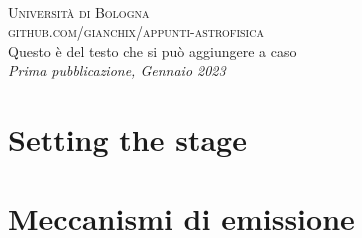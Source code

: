 \documentclass[11pt]{book} %
\begin{document}
\newpage
~\vfill
\thispagestyle{empty}


\noindent \textsc{Università di Bologna}\\

\noindent \textsc{github.com/gianchix/appunti-astrofisica}\\ %

\noindent Questo è del testo che si può aggiungere a caso\\ %

\noindent \textit{Prima pubblicazione, Gennaio 2023} %



\pagestyle{empty} %

\tableofcontents %


\pagestyle{fancy} %




%
{} %
\chapter{Setting the stage}




\chapter{Meccanismi di emissione}






\end{document}
